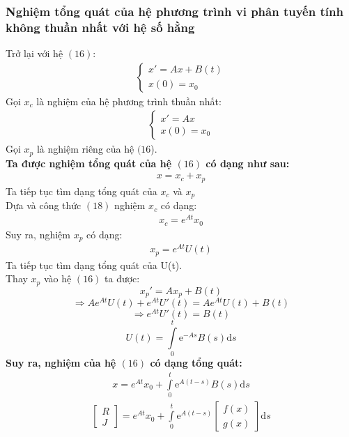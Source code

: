\subsubsection{Nghiệm tổng quát của hệ phương trình vi phân tuyến tính không thuần nhất với hệ số hằng}
Trở lại với hệ $(16)$:
\begin{align*}
    \begin{cases}
        x'=Ax+B(t)\\
        x(0)=x_0
    \end{cases}
\end{align*}
Gọi $x_c$ là nghiệm của hệ phương trình thuần nhất:
\begin{align*}
    \begin{cases}
        x'=Ax\\
        x(0)=x_0
    \end{cases}
\end{align*}
Gọi $x_p$ là nghiệm riêng của hệ $(16$).\\
\textbf{Ta được nghiệm tổng quát của hệ $(16)$ có dạng như sau:}
\begin{align*}
    x=x_c+x_p
\end{align*}
Ta tiếp tục tìm dạng tổng quát của $x_c$ và $x_p$\\
Dựa và công thức $(18)$ nghiệm $x_c$ có dạng:
\begin{align*}
    x_c=e^{At}x_0
\end{align*}
Suy ra, nghiệm $x_p$ có dạng:
\begin{align*}
    x_p=e^{At}U(t)
\end{align*}
Ta tiếp tục tìm dạng tổng quát của U(t).\\
Thay $x_p$ vào hệ $(16)$ ta được:
$$x_p'=Ax_p+B(t)$$
$$\Rightarrow Ae^{At}U(t)+e^{At}U'(t)=Ae^{At}U(t)+B(t)$$
$$\Rightarrow e^{At}U'(t)=B(t)$$
$$U(t)=\displaystyle\int\limits_{0}^{t} \mathrm{e}^{-As}B(s)\mathrm{d}s$$
\textbf{Suy ra, nghiệm của hệ $(16)$ có dạng tổng quát:}
\begin{align}
    x=e^{At}x_0+\displaystyle\int\limits_{0}^{t} \mathrm{e}^{A(t-s)}B(s)\mathrm{d}s
\end{align}
\begin{align}
\begin{bmatrix}
    R\\
    J
\end{bmatrix}
    =e^{At}x_0+\displaystyle\int\limits_{0}^{t} \mathrm{e}^{A(t-s)}
\begin{bmatrix}
    f(x)\\
    g(x)
\end{bmatrix}
    \mathrm{d}s
\end{align}
